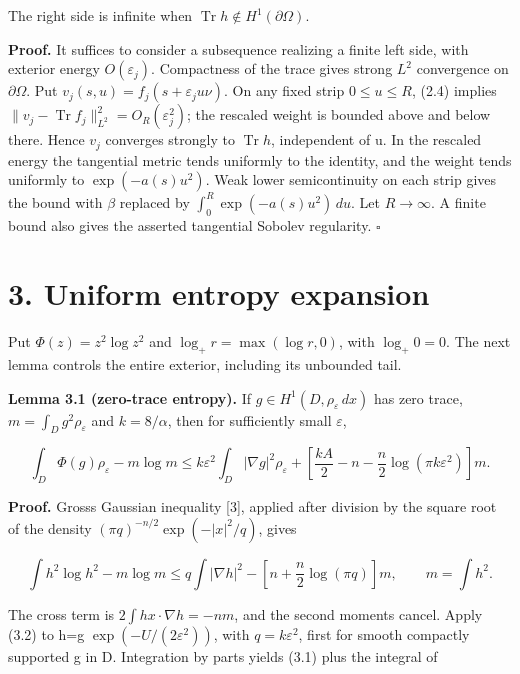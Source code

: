 \documentclass[11pt]{article}
\begin{document}
The right side is infinite when
\(\operatorname{Tr}h\notin H^1(\partial\Omega)\).

\textbf{Proof.} It suffices to consider a subsequence realizing a finite
left side, with exterior energy \(O(\varepsilon _j)\). Compactness of
the trace gives strong \(L^{2}\) convergence on \(\partial \Omega\). Put
\(v_j(s,u)=f_j(s+\varepsilon _ju\nu )\). On any fixed strip
\(0\leq u\leq R\), (2.4) implies
\(\|v_j-\operatorname{Tr}f_j\|_{L^2}^2=O_R(\varepsilon_j^2)\); the
rescaled weight is bounded above and below there. Hence \(v_j\)
converges strongly to \(\operatorname{Tr}h\), independent of u. In the
rescaled energy the tangential metric tends uniformly to the identity,
and the weight tends uniformly to \(\exp (-a(s)u^{2})\). Weak lower
semicontinuity on each strip gives the bound with \(\beta\) replaced by
\(\int_0^R\exp(-a(s)u^2)\,du\). Let \(R\to \infty\). A finite bound also
gives the asserted tangential Sobolev regularity. \(\square\)

\section{3. Uniform entropy expansion}\label{uniform-entropy-expansion}

Put \(\Phi(z)=z^2\log z^2\) and \(\log_+r=\max(\log r,0)\), with
\(\log _+0=0\). The next lemma controls the entire exterior, including
its unbounded tail.

\textbf{Lemma 3.1 (zero-trace entropy).} If
\(g\in H^1(D,\rho_\varepsilon\,dx)\) has zero trace,
\(m=\int _Dg^{2}\rho _\varepsilon\) and \(k=8/\alpha\), then for
sufficiently small \(\varepsilon\),

\[\int_D\Phi(g)\rho_\varepsilon-m\log m
\leq k\varepsilon^2\int_D|\nabla g|^2\rho_\varepsilon
+\left[\frac{kA}{2}-n-\frac n2\log(\pi k\varepsilon^2)\right]m.\tag{3.1}\]

\textbf{Proof.} Gross\textquotesingle s Gaussian inequality {[}3{]},
applied after division by the square root of the density
\((\pi q)^{-n/2}\exp (-|x|^{2}/q)\), gives

\[\int h^2\log h^2-m\log m
\leq q\int|\nabla h|^2-\left[n+\frac n2\log(\pi q)\right]m,
\qquad m=\int h^2.\tag{3.2}\]

The cross term is \(2\int hx\cdot \nabla h=-nm\), and the second moments
cancel. Apply (3.2) to h=g \(\exp (-U/(2\varepsilon ^{2}))\), with
\(q=k\varepsilon ^{2}\), first for smooth compactly supported g in D.
Integration by parts yields (3.1) plus the integral of
\end{document}
